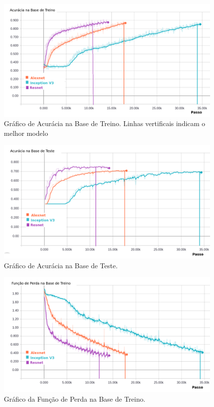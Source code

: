 \begin{figure}
\centering
\includegraphics[scale=0.5]{figuras/accuracy.png}
\caption{Gráfico de Acurácia na Base de Treino. Linhas vertificais indicam o melhor modelo }
\label{fig:acc-train}
\end{figure}

\begin{figure}
\centering
\includegraphics[scale=0.5]{figuras/accuracy_val.png}
\caption{Gráfico de Acurácia na Base de Teste.}
\label{fig:acc-val}
\end{figure}

\begin{figure}
\centering
\includegraphics[scale=0.5]{figuras/loss.png}
\caption{Gráfico da Função de Perda na Base de Treino.}
\label{fig:loss-train}
\end{figure}

